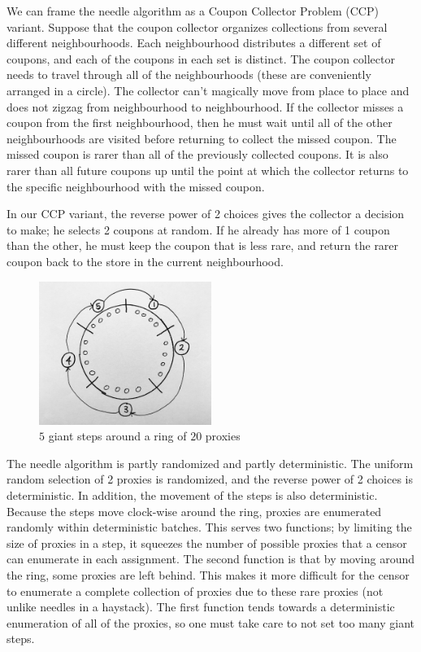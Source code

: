 We can frame the needle algorithm as a Coupon Collector Problem (CCP) variant. Suppose that the coupon collector organizes collections from several different neighbourhoods. Each neighbourhood distributes a different set of coupons, and each of the coupons in each set is distinct. The coupon collector needs to travel through all of the neighbourhoods (these are conveniently arranged in a circle). The collector can't magically move from place to place and does not zigzag from neighbourhood to neighbourhood. If the collector misses a coupon from the first neighbourhood, then he must wait until all of the other neighbourhoods are visited before returning to collect the missed coupon. The missed coupon is rarer than all of the previously collected coupons. It is also rarer than all future coupons up until the point at which the collector returns to the specific neighbourhood with the missed coupon.

In our CCP variant, the reverse power of 2 choices gives the collector a decision to make; he selects 2 coupons at random. If he already has more of 1 coupon than the other, he must keep the coupon that is less rare, and return the rarer coupon back to the store in the current neighbourhood. 

\begin{figure}[h!]
\centering
     \includegraphics[width=0.5\textwidth]{fig/giant_step_ring.png}
    \caption{$5$ giant steps around a ring of $20$ proxies}

    \label{fig:giantstepring}
\end{figure}


The needle algorithm is partly randomized and partly deterministic. The uniform random selection of 2 proxies is randomized, and the reverse power of 2 choices is deterministic. In addition, the movement of the steps is also deterministic. Because the steps move clock-wise around the ring, proxies are enumerated randomly within deterministic batches. This serves two functions; by limiting the size of proxies in a step, it squeezes the number of possible proxies that a censor can enumerate in each assignment. The second function is that by moving around the ring, some proxies are left behind. This makes it more difficult for the censor to enumerate a complete collection of proxies due to these rare proxies (not unlike needles in a haystack). The first function tends towards a deterministic enumeration of all of the proxies, so one must take care to not set too many giant steps. 

